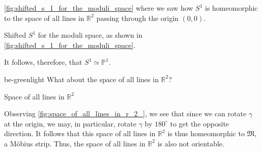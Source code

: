 \documentclass[notoc,notitlepage]{tufte-book}
\begin{document}
 \cref{fig:shifted_s_1_for_the_moduli_space} where we saw how $S^1$ is
homeomorphic to the space of all lines in $\mathbb{R}^2$ passing through the origin $(0,
0)$.
\begin{marginfigure}[5pt]
  \centering
  \caption{Shifted $S^1$ for the moduli space, as shown in
  \cref{fig:shifted_s_1_for_the_moduli_space}.}
\end{marginfigure}

It follows, therefore, that $S^1 \simeq \mathbb{P}^1$.

\begin{quotebox}{be-green}{light}
  What about the space of all lines in $\mathbb{R}^2$?
\end{quotebox}

\begin{marginfigure}
  \centering
  \caption{Space of all lines in $\mathbb{R}^2$}\label{fig:space_of_all_lines_in_r_2_}
\end{marginfigure}
Observing \cref{fig:space_of_all_lines_in_r_2_}, we see that since we can rotate $\gamma$
at the origin, we may, in particular, rotate $\gamma$ by $180^{\circ}$ to get the opposite
direction. It follows that this space of all lines in $\mathbb{R}^2$ is thus homeomorphic
to $\mathfrak{M}$, a M\"{o}bius strip. Thus, the space of all lines in $\mathbb{R}^2$ is
also not orientable.
\end{document}
